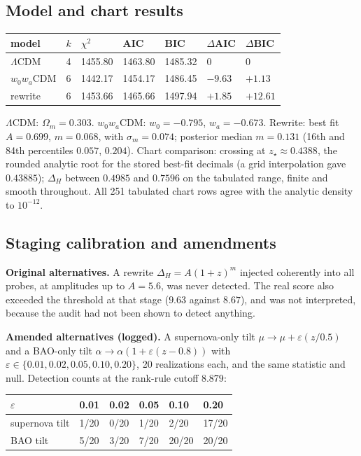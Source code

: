 \hypertarget{b.3-model-and-chart-results}{%
\subsection{Model and chart
results}\label{b.3-model-and-chart-results}}

\begin{longtable}[]{@{}lllllll@{}}
\toprule
model & \(k\) & \(\chi^2\) & AIC & BIC & \(\Delta\)AIC &
\(\Delta\)BIC\tabularnewline
\midrule
\endhead
\(\Lambda\)CDM & 4 & 1455.80 & 1463.80 & 1485.32 & 0 & 0\tabularnewline
\(w_0w_a\)CDM & 6 & 1442.17 & 1454.17 & 1486.45 & \(-9.63\) &
\(+1.13\)\tabularnewline
rewrite & 6 & 1453.66 & 1465.66 & 1497.94 & \(+1.85\) &
\(+12.61\)\tabularnewline
\bottomrule
\end{longtable}
\addtocounter{table}{-1}

\(\Lambda\)CDM: \(\Omega_m=0.303\). \(w_0w_a\)CDM: \(w_0=-0.795\),
\(w_a=-0.673\). Rewrite: best fit \(A=0.699\), \(m=0.068\), with
\(\sigma_m=0.074\); posterior median \(m=0.131\) (16th and 84th
percentiles \(0.057\), \(0.204\)). Chart comparison: crossing at
\(z_\star\approx0.4388\), the rounded analytic root for the stored
best-fit decimals (a grid interpolation gave \(0.43885\)); \(\Delta_H\)
between \(0.4985\) and \(0.7596\) on the tabulated range, finite and
smooth throughout. All 251 tabulated chart rows agree with the analytic
density to \(10^{-12}\).

\hypertarget{b.4-staging-calibration-and-amendments}{%
\subsection{Staging calibration and
amendments}\label{b.4-staging-calibration-and-amendments}}

\textbf{Original alternatives.} A rewrite \(\Delta_H=A(1+z)^m\) injected
coherently into all probes, at amplitudes up to \(A=5.6\), was never
detected. The real score also exceeded the threshold at that stage
(\(9.63\) against \(8.67\)), and was not interpreted, because the audit
had not been shown to detect anything.

\textbf{Amended alternatives (logged).} A supernova-only tilt
\(\mu\to\mu+\varepsilon(z/0.5)\) and a BAO-only tilt
\(\alpha\to\alpha(1+\varepsilon(z-0.8))\) with
\(\varepsilon\in\{0.01,0.02,0.05,0.10,0.20\}\), 20 realizations each,
and the same statistic and null. Detection counts at the rank-rule
cutoff \(8.879\):

\begin{longtable}[]{@{}llllll@{}}
\toprule
\(\varepsilon\) & 0.01 & 0.02 & 0.05 & 0.10 & 0.20\tabularnewline
\midrule
\endhead
supernova tilt & 1/20 & 0/20 & 1/20 & 2/20 & 17/20\tabularnewline
BAO tilt & 5/20 & 3/20 & 7/20 & 20/20 & 20/20\tabularnewline
\bottomrule
\end{longtable}
\addtocounter{table}{-1}


